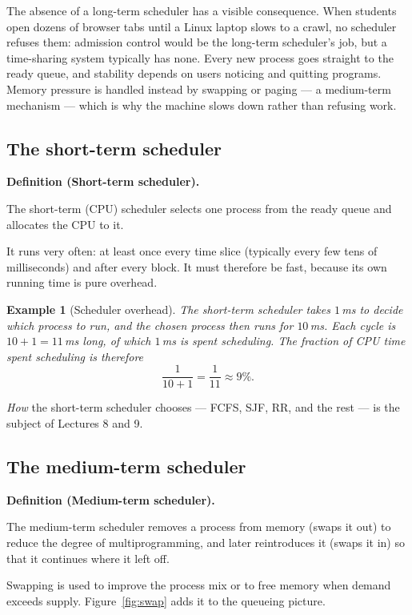 \documentclass[11pt]{article}
\newtheorem{example}{Example}
\newenvironment{definitionbox}[1]{%
  \par\noindent\textbf{Definition (#1).}\ \itshape
}{\par\vspace{0.3em}}
\begin{document}
The absence of a long-term scheduler has a visible consequence. When students
open dozens of browser tabs until a Linux laptop slows to a crawl, no scheduler
refuses them: admission control would be the long-term scheduler's job, but a
time-sharing system typically has none. Every new process goes straight to the
ready queue, and stability depends on users noticing and quitting programs.
Memory pressure is handled instead by swapping or paging --- a medium-term
mechanism --- which is why the machine slows down rather than refusing work.

\subsection{The short-term scheduler}

\begin{definitionbox}{Short-term scheduler}
The short-term (CPU) scheduler selects one process from the ready queue and
allocates the CPU to it.
\end{definitionbox}

It runs very often: at least once every time slice (typically every few tens of
milliseconds) and after every block. It must therefore be fast, because its
own running time is pure overhead.

\begin{example}[Scheduler overhead]
The short-term scheduler takes $1$\,ms to decide which process to run, and the
chosen process then runs for $10$\,ms. Each cycle is $10 + 1 = 11$\,ms long,
of which $1$\,ms is spent scheduling. The fraction of CPU time spent scheduling
is therefore
\[
  \frac{1}{10 + 1} = \frac{1}{11} \approx 9\%.
\]
\end{example}

\emph{How} the short-term scheduler chooses --- FCFS, SJF, RR, and the rest ---
is the subject of Lectures 8 and 9.

\subsection{The medium-term scheduler}

\begin{definitionbox}{Medium-term scheduler}
The medium-term scheduler removes a process from memory (swaps it out) to
reduce the degree of multiprogramming, and later reintroduces it (swaps it in)
so that it continues where it left off.
\end{definitionbox}

Swapping is used to improve the process mix or to free memory when demand
exceeds supply. Figure~\ref{fig:swap} adds it to the queueing picture.
\end{document}
